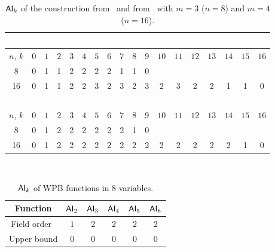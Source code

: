 \documentclass[11pt]{llncs}
\begin{document}
\begin{table}[h]
\center
\caption{$\mathsf{AI}_{k}$ of the construction from~\cite{AMC:DalMal23} and from~\cite{Mat:ZJZQ23} with $m=3$ ($n=8$) and $m=4$ ($n=16$).\label{table:publiedFunctions}}
\begin{tabular}{|c|c|c|c|c|c|c|c|c|c|c|c|c|c|c|c|c|c|}
\hline
\multicolumn{18}{|c|}{~\cite{AMC:DalMal23}} \\
\hline
$n$, $k$ & $0$ & $1$ & $2$ & $3$ & $4$ & $5$ & $6$ & $7$ & $8$ & $9$ & $10$ & $11$ & $12$ & $13$ & $14$ & $15$ & $16$ \\
\hline
8 & 0 & 1 & 1 & 2 & 2 & 2 & 2 & 1 & 1 &  0 &  &  &  &  &  &  &  \\
16 & 0 & 1 & 1 & 2 & 2 & 3 & 2 & 3 & 2 &  3 & 2 & 3 & 2 & 2 & 1 & 1 & 0 \\
\hline
\hline
\multicolumn{18}{|c|}{~\cite{Mat:ZJZQ23}} \\
\hline
$n$, $k$ & $0$ & $1$ & $2$ & $3$ & $4$ & $5$ & $6$ & $7$ & $8$ & $9$ & $10$ & $11$ & $12$ & $13$ & $14$ & $15$ & $16$ \\
\hline
8 & 0 & 1 & 2 & 2 & 2 & 2 & 2 & 2 & 1 &  0 &  &  &  &  &  &  &  \\
16 & 0 & 1 & 2 & 2 & 2 & 2 & 2 & 2 & 2 & 2  & 2 & 2 & 2 & 2 & 2 & 1 & 0 \\
\hline
\end{tabular}

\end{table}


\\



\begin{table}[h]
	\center 
	\begin{tabular}{|c| c|c|c|c|c|}
		\hline
		Function &  $\mathsf{AI}_{2}$ & $\mathsf{AI}_{3}$ & $\mathsf{AI}_{4}$ &  $\mathsf{AI}_{5}$ & $\mathsf{AI}_{6}$  \\ \hline 
		Field order~\cite{eprint:Meaux24} &$ 1$& $2$& $2$& $2$ &$2$ \\	\hline
		Upper bound & $0$ &  $0$ & $0$  &  $0$ & $0$ \\	\hline
	
		
	\end{tabular}
	\caption{$\mathsf{AI}_{k}$ of WPB functions in $8$ variables.}
	\label{tab:WPB8}
\end{table}
\end{document}
